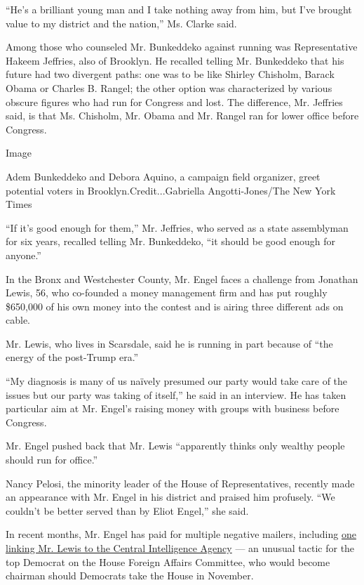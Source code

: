 ``He's a brilliant young man and I take nothing away from him, but I've
brought value to my district and the nation,'' Ms. Clarke said.

Among those who counseled Mr. Bunkeddeko against running was
Representative Hakeem Jeffries, also of Brooklyn. He recalled telling
Mr. Bunkeddeko that his future had two divergent paths: one was to be
like Shirley Chisholm, Barack Obama or Charles B. Rangel; the other
option was characterized by various obscure figures who had run for
Congress and lost. The difference, Mr. Jeffries said, is that Ms.
Chisholm, Mr. Obama and Mr. Rangel ran for lower office before Congress.

Image

Adem Bunkeddeko and Debora Aquino, a campaign field organizer, greet
potential voters in Brooklyn.Credit...Gabriella Angotti-Jones/The New
York Times

``If it's good enough for them,'' Mr. Jeffries, who served as a state
assemblyman for six years, recalled telling Mr. Bunkeddeko, ``it should
be good enough for anyone.''

In the Bronx and Westchester County, Mr. Engel faces a challenge from
Jonathan Lewis, 56, who co-founded a money management firm and has put
roughly \$650,000 of his own money into the contest and is airing three
different ads on cable.

Mr. Lewis, who lives in Scarsdale, said he is running in part because of
``the energy of the post-Trump era.''

``My diagnosis is many of us naïvely presumed our party would take care
of the issues but our party was taking of itself,'' he said in an
interview. He has taken particular aim at Mr. Engel's raising money with
groups with business before Congress.

Mr. Engel pushed back that Mr. Lewis ``apparently thinks only wealthy
people should run for office.''

Nancy Pelosi, the minority leader of the House of Representatives,
recently made an appearance with Mr. Engel in his district and praised
him profusely. ``We couldn't be better served than by Eliot Engel,'' she
said.

In recent months, Mr. Engel has paid for multiple negative mailers,
including
\href{https://int.graylady3jvrrxbe.onion/data/documenthelper/52-engel-cia-mailer/56e35fd9f054abe789be/optimized/full.pdf\#page=1}{one
linking Mr. Lewis to the Central Intelligence Agency} --- an unusual
tactic for the top Democrat on the House Foreign Affairs Committee, who
would become chairman should Democrats take the House in November.

